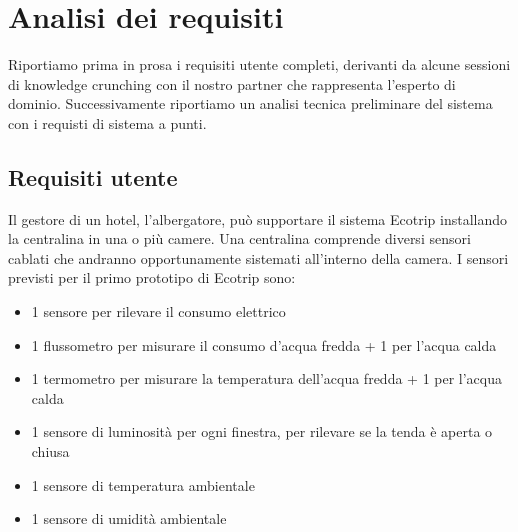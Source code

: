 
\section{Analisi dei requisiti}



Riportiamo prima in prosa i requisiti utente completi, derivanti da alcune sessioni di 
knowledge crunching con il nostro partner che rappresenta l'esperto di dominio.
Successivamente riportiamo un analisi tecnica preliminare del sistema con
i requisti di sistema a punti. 

\subsection{Requisiti utente}

Il gestore di un hotel, l'albergatore, può supportare il sistema Ecotrip
installando la centralina in una o più camere. Una centralina comprende diversi
sensori cablati che andranno opportunamente sistemati all'interno della camera.
I sensori previsti per il primo prototipo di Ecotrip sono:

\begin{itemize}
    \item 1 sensore per rilevare il consumo elettrico
    \item 1 flussometro per misurare il consumo d'acqua fredda + 1 per l'acqua calda
    \item 1 termometro per misurare la temperatura dell'acqua fredda + 1 per l'acqua calda
    \item 1 sensore di luminosità per ogni finestra, per rilevare se la tenda è aperta o chiusa
    \item 1 sensore di temperatura ambientale
    \item 1 sensore di umidità ambientale
\end{itemize}

